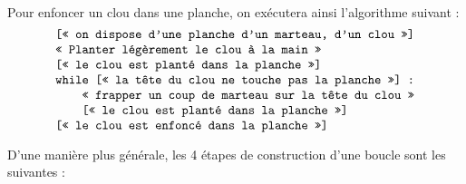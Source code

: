 Pour enfoncer un clou dans une planche, on exécutera ainsi l'algorithme suivant :
$$\begin{minipage}[t]{10cm}
\begin{verbatim}
[« on dispose d'une planche d'un marteau, d'un clou »]
« Planter légèrement le clou à la main »
[« le clou est planté dans la planche »]
while [« la tête du clou ne touche pas la planche »] :
    « frapper un coup de marteau sur la tête du clou »
    [« le clou est planté dans la planche »]
[« le clou est enfoncé dans la planche »]
\end{verbatim}
\end{minipage}$$

D'une manière plus générale, les 4 étapes de construction d'une boucle
sont les suivantes :
